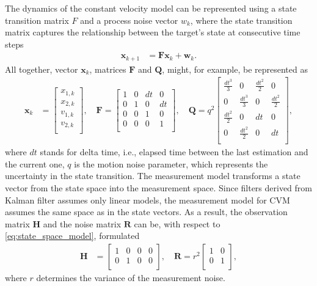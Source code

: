 The dynamics of the constant velocity model can be represented using a state transition matrix $F$  and a process
noise vector $w_k$, where the state transition matrix captures the relationship between the target's state at
consecutive time steps
\begin{align}
    \mathbf{x}_{k+1} &= \mathbf{F x}_k + \mathbf{w}_k.
\end{align}
All together, vector $\mathbf{x}_k$, matrices $\mathbf{F}$ and $\mathbf{Q}$, might, for example, be represented as
\begin{align}
    \mathbf{x}_k &=
        \begin{bmatrix}
            x_{1,k} \\
            x_{2,k} \\
            v_{1,k} \\
            v_{2,k} \\
        \end{bmatrix},
    \quad \mathbf{F} =
        \begin{bmatrix}
            1 & 0 & dt & 0 \\
            0 & 1 & 0 & dt \\
            0 & 0 & 1 & 0 \\
            0 & 0 & 0 & 1 \\
        \end{bmatrix},
    \quad \mathbf{Q} = q^2
        \begin{bmatrix}
            \frac{dt^3}{3} & 0 & \frac{dt^2}{2} & 0 \\
            0 & \frac{dt^3}{3} & 0 & \frac{dt^2}{2} \\
            \frac{dt^2}{2} & 0 & dt & 0 \\
            0 & \frac{dt^2}{2} & 0 & dt \\
        \end{bmatrix},
    \label{eq:state_space_model}
\end{align}
where $dt$ stands for delta time, i.e., elapsed time between the last estimation and the current one, $q$ is the
motion noise parameter, which represents the uncertainty in the state transition. The measurement model transforms a
state vector from the state space into the measurement space. Since filters derived from Kalman filter assumes only
linear models, the measurement model for CVM assumes the same space as in the state vectors. As a result, the
observation matrix $\mathbf{H}$ and the noise matrix $\mathbf{R}$ can be, with respect to \eqref{eq:state_space_model}, formulated
\begin{align}
    \mathbf{H} &=
    \begin{bmatrix}
        1 & 0 & 0 & 0 \\
        0 & 1 & 0 & 0 \\
    \end{bmatrix},
    \quad \mathbf{R} = r^2
    \begin{bmatrix}
        1 & 0  \\
        0 & 1  \\
    \end{bmatrix},
\end{align}
where $r$ determines the variance of the measurement noise.

